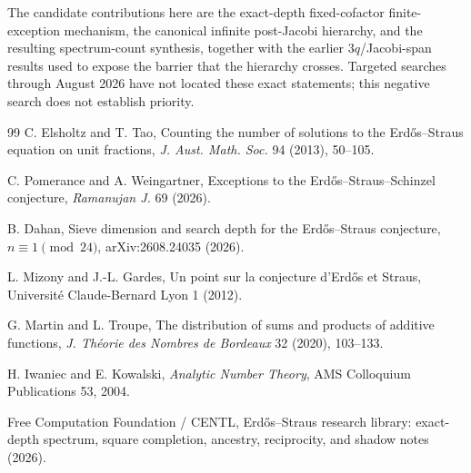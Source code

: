\documentclass[11pt]{article}
\theoremstyle{definition}
\begin{document}
The candidate contributions here are the exact-depth fixed-cofactor finite-exception mechanism, the canonical infinite post-Jacobi hierarchy, and the resulting spectrum-count synthesis, together with the earlier $3q$/Jacobi-span results used to expose the barrier that the hierarchy crosses. Targeted searches through August 2026 have not located these exact statements; this negative search does not establish priority.

\begin{thebibliography}{99}
C. Elsholtz and T. Tao,
Counting the number of solutions to the Erd\H{o}s--Straus equation on unit fractions,
\emph{J. Aust. Math. Soc.} 94 (2013), 50--105.

C. Pomerance and A. Weingartner,
Exceptions to the Erd\H{o}s--Straus--Schinzel conjecture,
\emph{Ramanujan J.} 69 (2026).

B. Dahan,
Sieve dimension and search depth for the Erd\H{o}s--Straus conjecture, $n\equiv1\pmod{24}$,
arXiv:2608.24035 (2026).

L. Mizony and J.-L. Gardes,
Un point sur la conjecture d'Erd\H{o}s et Straus,
Universit\'e Claude-Bernard Lyon 1 (2012).

G. Martin and L. Troupe,
The distribution of sums and products of additive functions,
\emph{J. Th\'eorie des Nombres de Bordeaux} 32 (2020), 103--133.

H. Iwaniec and E. Kowalski,
\emph{Analytic Number Theory},
AMS Colloquium Publications 53, 2004.

Free Computation Foundation / CENTL,
Erd\H{o}s--Straus research library: exact-depth spectrum, square completion, ancestry, reciprocity, and shadow notes (2026).
\end{thebibliography}
\end{document}

